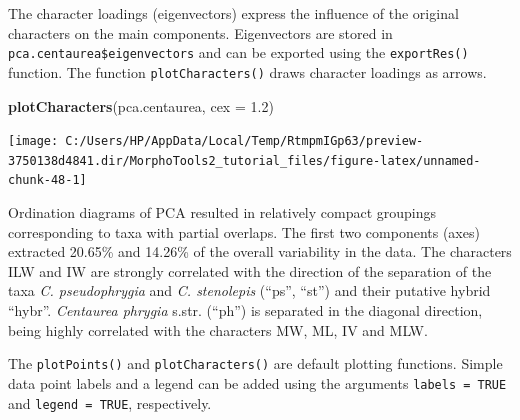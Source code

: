 \documentclass[
]{article}
\newenvironment{Shaded}{\begin{snugshade}}{\end{snugshade}}
\newcommand{\DataTypeTok}[1]{\textcolor[rgb]{0.13,0.29,0.53}{#1}}
\newcommand{\FloatTok}[1]{\textcolor[rgb]{0.00,0.00,0.81}{#1}}
\newcommand{\KeywordTok}[1]{\textcolor[rgb]{0.13,0.29,0.53}{\textbf{#1}}}
\newcommand{\NormalTok}[1]{#1}
\newcommand{\OperatorTok}[1]{\textcolor[rgb]{0.81,0.36,0.00}{\textbf{#1}}}
\newcommand{\StringTok}[1]{\textcolor[rgb]{0.31,0.60,0.02}{#1}}
\begin{document}
\begin{Shaded}
\end{Shaded}

The character loadings (eigenvectors) express the influence of the
original characters on the main components. Eigenvectors are stored in
\texttt{pca.centaurea\$eigenvectors} and can be exported using the
\texttt{exportRes()} function. The function \texttt{plotCharacters()}
draws character loadings as arrows.

\begin{Shaded}
\begin{Highlighting}[]
\KeywordTok{plotCharacters}\NormalTok{(pca.centaurea, }\DataTypeTok{cex =} \FloatTok{1.2}\NormalTok{)}
\end{Highlighting}
\end{Shaded}

\begin{center}\texttt{[image: C:/Users/HP/AppData/Local/Temp/RtmpmIGp63/preview-3750138d4841.dir/MorphoTools2\_tutorial\_files/figure-latex/unnamed-chunk-48-1]} \end{center}

\begin{Shaded}
\end{Shaded}

Ordination diagrams of PCA resulted in relatively compact groupings
corresponding to taxa with partial overlaps. The first two components
(axes) extracted 20.65\% and 14.26\% of the overall variability in the
data. The characters ILW and IW are strongly correlated with the
direction of the separation of the taxa \emph{C. pseudophrygia} and
\emph{C. stenolepis} (``ps'', ``st'') and their putative hybrid
``hybr''. \emph{Centaurea phrygia} s.str. (``ph'') is separated in the
diagonal direction, being highly correlated with the characters MW, ML,
IV and MLW.

The \texttt{plotPoints()} and \texttt{plotCharacters()} are default
plotting functions. Simple data point labels and a legend can be added
using the arguments \texttt{labels\ =\ TRUE} and
\texttt{legend\ =\ TRUE}, respectively.
\end{document}
